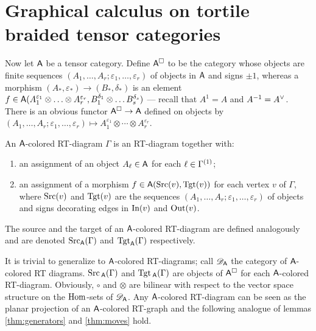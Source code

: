 \section{Graphical calculus on tortile braided tensor categories}
\label{sec:rt-gc}
Now let $\A$ be a tensor category. Define $\freemsc{\A}$ to be the
category whose objects are finite sequences $(A_1, \ldots, A_r; \varepsilon_1, \ldots,
\varepsilon_r)$ of objects in $\A$ and signs $\pm1$, whereas a morphism $(A_*,
\varepsilon_*) \to (B_*, \delta_*)$ is an element $f \in \A(A_1^{\varepsilon_1} \otimes \ldots \otimes
A_r^{\varepsilon_r}, B_1^{\delta_1} \otimes \ldots B_s^{\delta_s})$ --- recall that $A^1 = A$
and $A^{-1} = \rdl{A}$.  There is an obvious functor $\freemsc{\A} \to
\A$ defined on objects by $(A_1, \ldots, A_r; \varepsilon_1, \ldots, \varepsilon_r) \mapsto
A_1^{\varepsilon_1} \otimes \cdots \otimes A_r^{\varepsilon_r}$.
\begin{definition}
  An $\A$-colored RT-diagram $\Gamma$ is an RT-diagram together with:
  \begin{enumerate}
  \item an assignment of an object $A_\ell \in \A$ for each
    $\ell\in\Edges{\Gamma}$;
  \item an assignment of a morphism $f\in\A(\Src(v),\Tgt(v))$ for each
    vertex $v$ of $\Gamma$, where $\Src(v)$ and $\Tgt(v)$ are the
    sequences $(A_1, \ldots, A_r;\varepsilon_1, \ldots, \varepsilon_r)$ of objects and signs
    decorating edges in $\In(v)$ and $\Out(v)$.
  \end{enumerate}
  The source and the target of an $\A$-colored RT-diagram are defined
  analogously and are denoted $\Src_\A(\Gamma)$ and $\Tgt_\A(\Gamma)$ respectively.
\end{definition}
It is trivial to generalize  to
$\A$-colored RT-diagrams; call $\RTD[\A]$ the category of
$\A$-colored RT diagrams. $\Src{}_{\A}(\Gamma)$ and $\Tgt{}_{\A}(\Gamma)$ are
objects of $\freemsc{\A}$ for each $\A$-colored RT-diagram.
Obviously, $\circ$ and $\otimes$ are bilinear with respect to the vector space
structure on the $\Hom$-sets of $\RTD[\A]$. Any $\A$-colored
RT-diagram can be seen as the planar projection of an $\A$-colored
RT-graph and the following analogue of lemmas \ref{thm:generators}
and \ref{thm:moves} hold.
